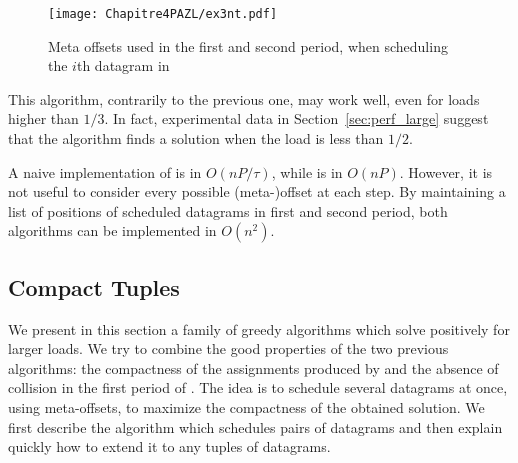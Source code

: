      \begin{figure}
      \begin{center}
      \texttt{[image: Chapitre4PAZL/ex3nt.pdf]}
      \end{center}
      \caption{Meta offsets used in the first and second period, when scheduling the $i$th datagram in \metaoffset}
      \label{fig:metaoffset}
      \end{figure}

  
This algorithm, contrarily to the previous one, may work well, even for loads higher than $1/3$.
In fact, experimental data in Section~\ref{sec:perf_large} suggest that the algorithm finds a solution when the load is less than $1/2$.




A naive implementation of \metaoffset is in $O(n P/\tau)$, while \firstfit is in $O(nP)$.
However, it is not useful to consider every possible (meta-)offset at each step. By maintaining
a list of positions of scheduled datagrams in first and second period, both algorithms can be implemented in $O(n^2)$.


\subsection{Compact Tuples}\label{sec:compacttuple}

We present in this section a family of greedy algorithms which solve \pma positively for larger loads. We try to combine the good properties of the two previous algorithms: the compactness of the assignments produced by \firstfit and the absence of collision in the first period of \metaoffset. The idea is to schedule several datagrams at once, using meta-offsets, to maximize the compactness of the obtained solution. We first describe the algorithm which schedules pairs of datagrams and then explain quickly how to extend it to any tuples of datagrams.


